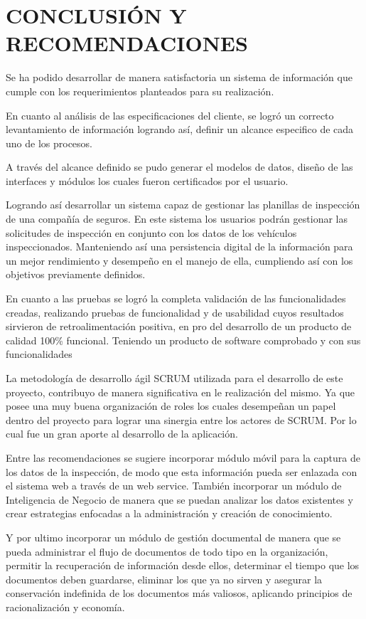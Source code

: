 \chapter*{CONCLUSIÓN Y RECOMENDACIONES }



\setlength{\parskip}{5mm}

Se ha podido desarrollar de manera satisfactoria un sistema de información que cumple con los requerimientos planteados para su realización.

En cuanto al análisis de las especificaciones del cliente, se logró un correcto levantamiento de información logrando así, definir un alcance especifico de cada uno de los procesos.

A través del alcance definido se pudo generar el modelos de datos, diseño de las interfaces y módulos los cuales fueron certificados por el usuario.

Logrando así desarrollar un sistema capaz de gestionar las planillas de inspección de una compañía de seguros. En este sistema los usuarios podrán gestionar las solicitudes de inspección en conjunto con los datos de los vehículos inspeccionados. Manteniendo así una persistencia digital de la información para un mejor rendimiento y desempeño en el manejo de ella, cumpliendo así con los objetivos previamente definidos.

En cuanto a las pruebas se logró la completa validación de las funcionalidades creadas, realizando pruebas de funcionalidad y de usabilidad cuyos resultados sirvieron de retroalimentación positiva, en pro del desarrollo de un producto de calidad 100\% funcional. Teniendo un producto de software comprobado y con sus funcionalidades 

La metodología de desarrollo ágil SCRUM utilizada para el desarrollo de este proyecto, contribuyo de manera significativa en le realización del mismo. Ya que posee una muy buena organización de roles los cuales desempeñan un papel dentro del proyecto para lograr una sinergia entre los actores de SCRUM. Por lo cual fue un gran aporte al desarrollo de la aplicación.

Entre las recomendaciones se sugiere incorporar módulo móvil para la captura de los datos de la inspección, de modo que esta información pueda ser enlazada con el sistema web a través de un web service. También incorporar un módulo de Inteligencia de Negocio de manera que se puedan analizar los datos existentes y crear estrategias enfocadas a la administración y creación de conocimiento.

Y por ultimo incorporar un módulo de gestión documental de manera que se pueda administrar el flujo de documentos de todo tipo en la organización, permitir la recuperación de información desde ellos, determinar el tiempo que los documentos deben guardarse, eliminar los que ya no sirven y asegurar la conservación indefinida de los documentos más valiosos, aplicando principios de racionalización y economía.


\setlength{\parskip}{0mm}